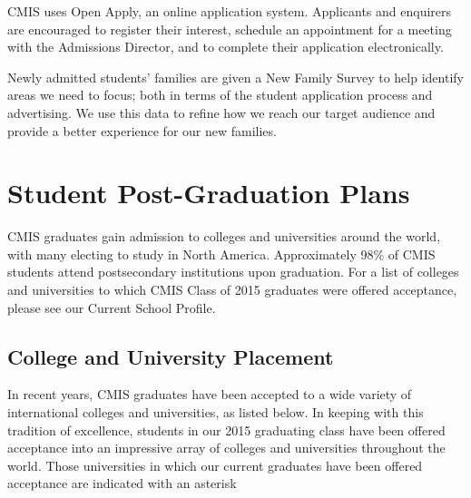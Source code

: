 \documentclass{report}
\begin{document}
CMIS uses Open Apply, an online application system.  Applicants and enquirers are encouraged to register their interest, schedule an appointment for a meeting with the Admissions Director, and to complete their application electronically.  

Newly admitted students’ families are given a New Family Survey to help identify areas we need to focus; both in terms of the student application process and advertising. We use this data to refine how we reach our target audience and provide a better experience for our new families.

\section{Student Post-Graduation Plans}

CMIS graduates gain admission to colleges and universities around the world, with many electing to study in North America. Approximately 98\% of CMIS students attend post­secondary institutions upon graduation. For a list of colleges and universities to which CMIS Class of 2015 graduates were offered acceptance, please see our Current School Profile.

\subsection{College and University Placement}

In recent years, CMIS graduates have been accepted to a wide variety of international colleges and universities, as listed below. In keeping with this tradition of excellence, students in our 2015 graduating class have been offered acceptance into an impressive array of colleges and universities throughout the world. Those universities in which our current graduates have been offered acceptance are indicated with an asterisk
\end{document}
